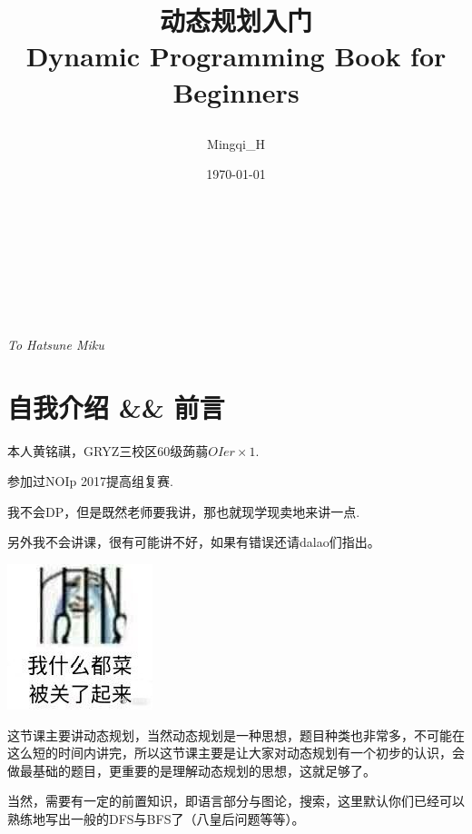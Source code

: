 \documentclass{article}
\theoremstyle{nonumberplain}
\begin{document}
\title{\Huge 动态规划入门\\\Large Dynamic Programming Book for Beginners\\\author{Mingqi\_H}\date{\today}}
\maketitle

\thispagestyle{empty}%
\pagestyle{empty}%

\ \\
\ \\
\ \\
\newpage
\ \\\ \\
\begin{center}\em{\large{To Hatsune Miku}}\end{center}
\newpage
\tableofcontents
\newpage

\pagestyle{plain}%
\setcounter{page}{1}
\setcounter{section}{-1}

\section{自我介绍 \&\& 前言}

本人黄铭祺，GRYZ三校区60级蒟蒻$OIer\times 1$.

参加过NOIp 2017提高组复赛.

我不会DP，但是既然老师要我讲，那也就现学现卖地来讲一点.

另外我不会讲课，很有可能讲不好，如果有错误还请dalao们指出。

\begin{center}\includegraphics[scale=0.25]{iampoor.jpg}\end{center}

这节课主要讲动态规划，当然动态规划是一种思想，题目种类也非常多，不可能在这么短的时间内讲完，所以这节课主要是让大家对动态规划有一个初步的认识，会做最基础的题目，更重要的是理解动态规划的思想，这就足够了。

当然，需要有一定的前置知识，即语言部分与图论，搜索，这里默认你们已经可以熟练地写出一般的DFS与BFS了（八皇后问题等等）。
\end{document}
